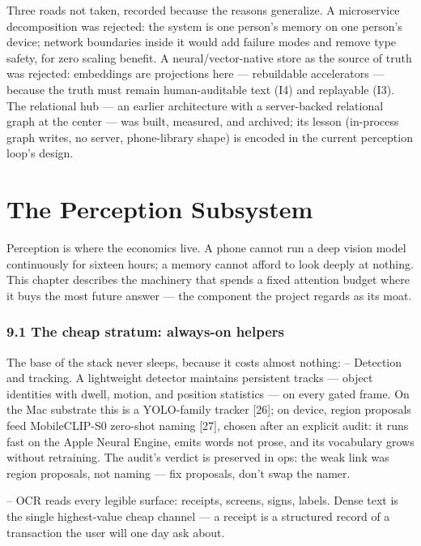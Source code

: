 Three roads not taken, recorded because the reasons generalize. A microservice decomposition was rejected: the system is one person's memory on one person's device; network boundaries inside it would add failure modes and remove type safety, for zero scaling benefit. A neural/vector-native store as the source of truth was rejected: embeddings are projections here --- rebuildable accelerators --- because the truth must remain human-auditable text (I4) and replayable (I3). The relational hub --- an earlier architecture with a server-backed relational graph at the center --- was built, measured, and archived; its lesson (in-process graph writes, no server, phone-library shape) is encoded in the current perception loop's design.

\chapter{The Perception Subsystem}\label{the-perception-subsystem}

Perception is where the economics live. A phone cannot run a deep vision model continuously for sixteen hours; a memory cannot afford to look deeply at nothing. This chapter describes the machinery that spends a fixed attention budget where it buys the most future answer --- the component the project regards as its moat.

\subsection{9.1 The cheap stratum: always-on helpers}\label{the-cheap-stratum-always-on-helpers}

The base of the stack never sleeps, because it costs almost nothing: -- Detection and tracking. A lightweight detector maintains persistent tracks --- object identities with dwell, motion, and position statistics --- on every gated frame. On the Mac substrate this is a YOLO-family tracker {[}26{]}; on device, region proposals feed MobileCLIP-S0 zero-shot naming {[}27{]}, chosen after an explicit audit: it runs fast on the Apple Neural Engine, emits words not prose, and its vocabulary grows without retraining. The audit's verdict is preserved in ops: the weak link was region proposals, not naming --- fix proposals, don't swap the namer.

-- OCR reads every legible surface: receipts, screens, signs, labels. Dense text is the single highest-value cheap channel --- a receipt is a structured record of a transaction the user will one day ask about.

